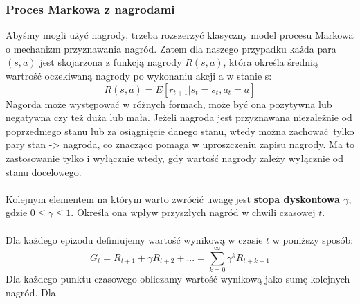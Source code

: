 \documentclass[a4paper, 10pt]{article}
\begin{document}
    \subsubsection{Proces Markowa z nagrodami}
    Abyśmy mogli użyć nagrody, trzeba rozszerzyć klasyczny model procesu Markowa o mechanizm przyznawania nagród.
    Zatem dla naszego przypadku każda para \( (s,a) \) jest skojarzona z funkcją nagrody \( R(s,a) \), która określa średnią wartrość oczekiwaną nagrody po wykonaniu
    akcji a w stanie s:
    \[ R(s,a) = E[r_{t+1}|s_t = s_t, a_t = a] \]
    Nagorda może występować w różnych formach, może być ona pozytywna lub negatywna czy też duża lub mała. Jeżeli nagroda jest
    przyznawana niezależnie od poprzedniego stanu lub za osiągnięcie danego stanu, wtedy można zachować tylko pary stan -> nagroda, co znacząco
    pomaga w uproszczeniu zapisu nagrody. Ma to zastosowanie tylko i wyłącznie wtedy, gdy wartość nagrody zależy wyłącznie 
    od stanu docelowego.
    \\ \\
    Kolejnym elementem na którym warto zwrócić uwagę jest \textbf{stopa dyskontowa \( \gamma \)}, gdzie \( 0 \leq \gamma \leq 1 \). 
    Określa ona wpływ przyszłych nagród w chwili czasowej \( t \).
    \\ \\
    Dla każdego epizodu definiujemy wartość wynikową w czasie \( t \) w poniższy sposób:
    \[ G_t = R_{t+1} + \gamma R_{t+2} + ... = \sum_{k=0}^{\infty} \gamma^k R_{t+k+1} \]
    Dla każdego punktu czasowego obliczamy wartość wynikową jako sumę kolejnych nagród. Dla 
\end{document}
